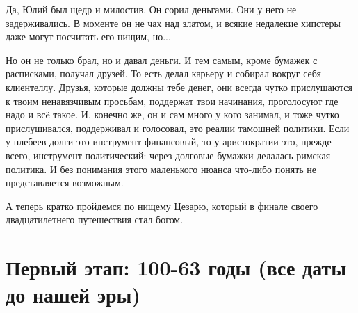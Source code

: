 Да, Юлий был щедр и милостив. Он сорил деньгами. Они у него не задерживались. В моменте он не чах над златом, и всякие недалекие хипстеры даже могут посчитать его нищим, но...


Но он не только брал, но и давал деньги. И тем самым, кроме бумажек с расписками, получал друзей. То есть делал карьеру и собирал вокруг себя клиентеллу. Друзья, которые должны тебе денег, они всегда чутко прислушаются к твоим ненавязчивым просьбам, поддержат твои начинания, проголосуют где надо и всë такое. И, конечно же, он и сам много у кого занимал, и тоже чутко прислушивался, поддерживал и голосовал, это реалии тамошней политики. Если у плебеев долги это инструмент финансовый, то у аристократии это, прежде всего, инструмент политический: через долговые бумажки делалась римская политика. И без понимания этого маленького нюанса что-либо понять не представляется возможным.


А теперь кратко пройдемся по нищему Цезарю, который в финале своего двадцатилетнего путешествия стал богом.




\section{Первый этап: 100-63 годы (все даты до нашей эры)}

